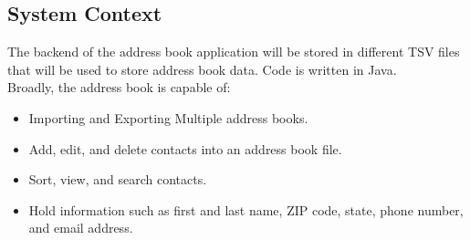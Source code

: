 \documentclass[a4paper, 11pt]{article}
\begin{document}
\subsection{System Context}
The backend of the address book application will be stored in different TSV files that will be used to store address book data. Code is written in Java.\\
Broadly, the address book is capable of:
\begin{itemize}
	\item Importing and Exporting Multiple address books.
	\item Add, edit, and delete contacts into an address book file.
	\item Sort, view, and search contacts.
	\item Hold information such as first and last name, ZIP code, state, phone number, and email address.
\end{itemize}
\end{document}
